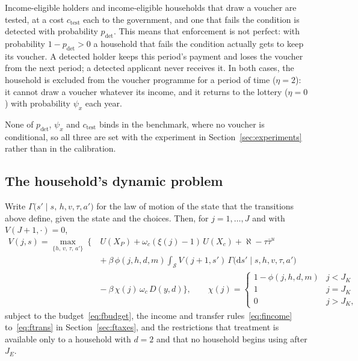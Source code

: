 \documentclass[10pt]{article}
\begin{document}
Income-eligible holders and income-eligible households that draw a voucher are tested, at a cost
$c_{\text{test}}$ each to the government, and one that fails the condition is detected with probability
$p_{\text{det}}$. This means that enforcement is not perfect: with probability $1-p_{\text{det}}>0$ a household that fails the condition actually gets to keep its voucher. A detected holder keeps this period's payment
and loses the voucher from the next period; a detected applicant never receives it. In both cases,
the household is excluded from the voucher programme for a period of time ($\eta=2$): it cannot draw a voucher whatever its income, and it
returns to the lottery ($\eta=0$) with probability $\psi_x$ each year.

None of
$p_{\text{det}}$, $\psi_x$ and $c_{\text{test}}$ binds in the benchmark, where no voucher
is conditional, so all three are set with the experiment in
Section~\ref{sec:experiments} rather than in the calibration.

\subsection{The household's dynamic problem}\label{sec:fproblem}

Write $\Gamma\big(s'\mid s,\,h,v,\tau,a'\big)$ for the law of motion of the state that the transitions above define, given the state and the choices. Then, for $j=1,\dots,J$ and with $V(J{+}1,\cdot)=0$,
\begin{equation}\label{eq:fbellman}
\begin{aligned}
V(j,s)=\max_{\{h,\,v,\,\tau,\,a'\}}\ \Bigg\{\
&U(X_P)+\omega_c(\xi(j)-1)\,U(X_c)+\aleph-\tau\bar\tau^{u}\\[2pt]
&+\ \beta\,\phi(j,h,d,m)\!\int_{\mathcal S}\! V(j{+}1,s')\,
\Gamma\big(\mathrm{d}s'\mid s,h,v,\tau,a'\big)\\[2pt]
&-\ \beta\,\chi(j)\,\omega_c\,D(y,d)\Bigg\},
\qquad
\chi(j)=\begin{cases}1-\phi(j,h,d,m) & j<J_K\\ 1 & j=J_K\\ 0 & j>J_K,\end{cases}
\end{aligned}
\end{equation}
subject to the budget~\eqref{eq:fbudget}, the income and transfer
rules~\eqref{eq:fincome} to~\eqref{eq:ftrans} in Section~\ref{sec:ftaxes}, and the restrictions that treatment is
available only to a household with $d=2$ and that no household begins using after $J_E$.
\end{document}

